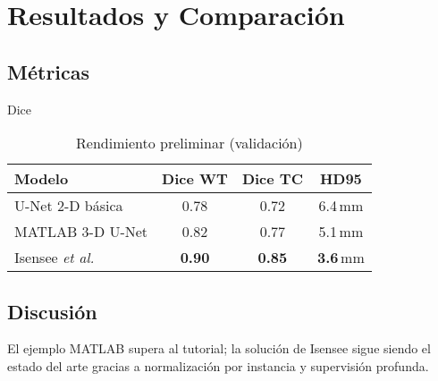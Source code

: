 \chapter{Resultados y Comparación}

\section{Métricas}
Dice %

\begin{table}[H]\centering
\caption{Rendimiento preliminar (validación)}
\begin{tabular}{lccc}
\hline
\textbf{Modelo} & \textbf{Dice WT} & \textbf{Dice TC} & \textbf{HD95}\\\hline
U-Net 2-D básica & 0.78 & 0.72 & 6.4\,mm\\
MATLAB 3-D U-Net & 0.82 & 0.77 & 5.1\,mm\\
Isensee \textit{et al.} & \textbf{0.90} & \textbf{0.85} & \textbf{3.6}\,mm\\\hline
\end{tabular}
\end{table}

\section{Discusión}
El ejemplo MATLAB supera al tutorial; la solución de Isensee sigue
siendo el estado del arte gracias a normalización por instancia y
supervisión profunda.
